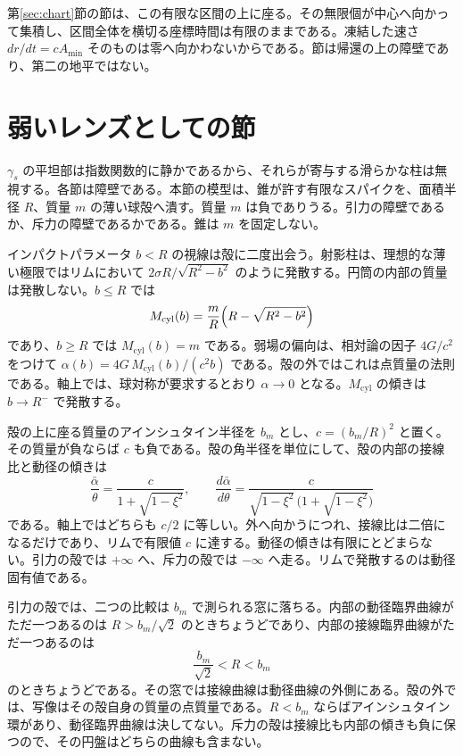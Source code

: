 \documentclass[a4paper]{article}
\begin{document}
第\ref{sec:chart}節の節は、この有限な区間の上に座る。その無限個が中心へ向かって集積し、区間全体を横切る座標時間は有限のままである。凍結した速さ \(dr/dt=c A_{\min}\) そのものは零へ向かわないからである。節は帰還の上の障壁であり、第二の地平ではない。

\section{弱いレンズとしての節}
\label{sec:shells}

\(\gamma_s\) の平坦部は指数関数的に静かであるから、それらが寄与する滑らかな柱は無視する。各節は障壁である。本節の模型は、錐が許す有限なスパイクを、面積半径 \(R\)、質量 \(m\) の薄い球殻へ潰す。質量 \(m\) は負でありうる。引力の障壁であるか、斥力の障壁であるかである。錐は \(m\) を固定しない。

インパクトパラメータ \(b<R\) の視線は殻に二度出会う。射影柱は、理想的な薄い極限ではリムにおいて \(2\sigma R/\sqrt{R^2-b^2}\) のように発散する。円筒の内部の質量は発散しない。\(b\le R\) では
\begin{equation}
\label{eq:mcyl}
M_{\mathrm{cyl}}(b)=\frac{m}{R}\Bigl(R-\sqrt{R^2-b^2}\Bigr)
\end{equation}
であり、\(b\ge R\) では \(M_{\mathrm{cyl}}(b)=m\) である。弱場の偏向は、相対論の因子 \(4G/c^2\) をつけて \(\alpha(b)=4G\,M_{\mathrm{cyl}}(b)/(c^2 b)\) である。殻の外ではこれは点質量の法則である。軸上では、球対称が要求するとおり \(\alpha\to 0\) となる。\(M_{\mathrm{cyl}}\) の傾きは \(b\to R^-\) で発散する。

殻の上に座る質量のアインシュタイン半径を \(b_m\) とし、\(c=(b_m/R)^2\) と置く。その質量が負ならば \(c\) も負である。殻の角半径を単位にして、殻の内部の接線比と動径の傾きは
\begin{equation}
\label{eq:shell-profiles}
\frac{\bar\alpha}{\theta}=\frac{c}{1+\sqrt{1-\xi^2}},
\qquad
\frac{d\bar\alpha}{d\theta}
  =\frac{c}{\sqrt{1-\xi^2}\,\bigl(1+\sqrt{1-\xi^2}\bigr)}
\end{equation}
である。軸上ではどちらも \(c/2\) に等しい。外へ向かうにつれ、接線比は二倍になるだけであり、リムで有限値 \(c\) に達する。動径の傾きは有限にとどまらない。引力の殻では \(+\infty\) へ、斥力の殻では \(-\infty\) へ走る。リムで発散するのは動径固有値である。

引力の殻では、二つの比較は \(b_m\) で測られる窓に落ちる。内部の動径臨界曲線がただ一つあるのは \(R>b_m/\sqrt{2}\) のときちょうどであり、内部の接線臨界曲線がただ一つあるのは
\begin{equation}
\label{eq:shell-window}
\frac{b_m}{\sqrt{2}}<R<b_m
\end{equation}
のときちょうどである。その窓では接線曲線は動径曲線の外側にある。殻の外では、写像はその殻自身の質量の点質量である。\(R<b_m\) ならばアインシュタイン環があり、動径臨界曲線は決してない。斥力の殻は接線比も内部の傾きも負に保つので、その円盤はどちらの曲線も含まない。
\end{document}
